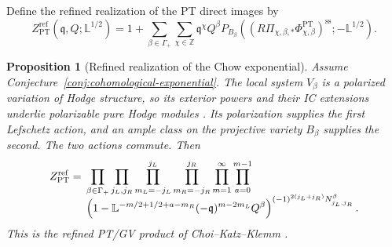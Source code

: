 \documentclass[11pt,reqno]{amsart}
\newtheorem{proposition}[theorem]{Proposition}
\theoremstyle{definition}
\newcommand{\PT}{\operatorname{PT}}
\begin{document}
Define the refined realization of the PT direct images by
\begin{equation}\label{eq:refined-pt-realization}
 Z_{\PT}^{\mathrm{ref}}(\mathfrak q,Q;\mathbb L^{1/2})
 =1+\sum_{\beta\in\Gamma_+}\sum_{\chi\in\mathbb Z}
 \mathfrak q^\chi Q^\beta
 P_{B_\beta}\!\left(
   (R\Pi_{\chi,\beta,*}\Phi_{\chi,\beta}^{\PT})^{\mathrm{ss}};
   -\mathbb L^{1/2}\right).
\end{equation}

\begin{proposition}[Refined realization of the Chow exponential]
\label{prop:refined-realization}
Assume Conjecture~\ref{conj:cohomological-exponential}.  The local system
$V_\beta$ is a polarized variation of Hodge structure, so its exterior
powers and their IC extensions underlie polarizable pure Hodge modules
\cite{SaitoHodge}.  Its polarization supplies the first Lefschetz action,
and an ample class on the projective variety $B_\beta$ supplies the second.
The two actions commute.  Then
\begin{align}\label{eq:ckk-product}
 Z_{\PT}^{\mathrm{ref}}
 ={}&\prod_{\beta\in\Gamma_+}\prod_{j_L,j_R}
 \prod_{m_L=-j_L}^{j_L}\prod_{m_R=-j_R}^{j_R}
 \prod_{m=1}^{\infty}\prod_{a=0}^{m-1} \notag\\[-2mm]
 &\left(1-\mathbb L^{-m/2+1/2+a-m_R}
 (-\mathfrak q)^{m-2m_L}Q^\beta\right)^{
 (-1)^{2(j_L+j_R)}N^\beta_{j_L,j_R}}.
\end{align}
This is the refined PT/GV product of Choi--Katz--Klemm
\cite[Equation~(8.1)]{CKK}.
\end{proposition}
\end{document}
